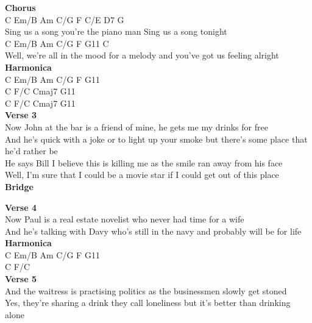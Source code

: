 \documentclass[a4paper]{article}
\begin{document}
{{        }
        \textbf{Chorus}
        ~\\
        {
            \cutive
            \obeyspaces
C         Em/B            Am        C/G  F         C/E    D7    G
\\
Sing us a song you're the piano man      Sing us a song tonight
\\
            C          Em/B       Am     C/G     F             G11       C
\\
Well, we're all in the mood for a melody     and you've got us feeling alright
\\

        }
        \textbf{Harmonica}
        ~\\
        {
            \cutive
            \obeyspaces
C  Em/B  Am  C/G  F  G11
\\
C  F/C  Cmaj7  G11
\\
C  F/C  Cmaj7  G11
\\

        }
        \textbf{Verse 3}
        ~\\
        {
            \cutive
            \obeyspaces
Now John at the bar is a friend of mine,  he gets me my drinks for free
\\
And he's quick with a joke or to light up your smoke but there's some place that he'd rather be
\\
    He says Bill I believe this is killing me  as the smile ran away from his face
\\
Well, I'm sure that I could be a movie star if I could get out of this place
\\

        }
        \textbf{Bridge}
        ~\\
        {
            \cutive
            \obeyspaces

        }
        \textbf{Verse 4}
        ~\\
        {
            \cutive
            \obeyspaces
Now Paul is a real estate novelist who never had time for a wife
\\
And he's talking with Davy who's still in the navy and probably will be for life
\\

        }
        \textbf{Harmonica}
        ~\\
        {
            \cutive
            \obeyspaces
C  Em/B  Am  C/G  F  G11
\\
C        F/C
\\

        }
        \textbf{Verse 5}
        ~\\
        {
            \cutive
            \obeyspaces
And the waitress is practising politics  as the businessmen slowly get stoned
\\
Yes, they're sharing a drink they call loneliness  but it's better than drinking alone
\\

}}
\end{document}
